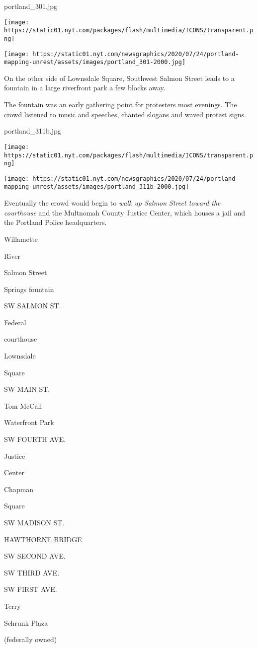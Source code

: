 portland\_301.jpg

\texttt{[image: https://static01.nyt.com/packages/flash/multimedia/ICONS/transparent.png]}

\texttt{[image: https://static01.nyt.com/newsgraphics/2020/07/24/portland-mapping-unrest/assets/images/portland\_301-2000.jpg]}

On the other side of Lownsdale Square, Southwest Salmon Street leads to
a fountain in a large riverfront park a few blocks away.

The fountain was an early gathering point for protesters most evenings.
The crowd listened to music and speeches, chanted slogans and waved
protest signs.

portland\_311b.jpg

\texttt{[image: https://static01.nyt.com/packages/flash/multimedia/ICONS/transparent.png]}

\texttt{[image: https://static01.nyt.com/newsgraphics/2020/07/24/portland-mapping-unrest/assets/images/portland\_311b-2000.jpg]}

Eventually the crowd would begin to \emph{walk up Salmon Street toward
the courthouse} and the Multnomah County Justice Center, which houses a
jail and the Portland Police headquarters.

Willamette

River

Salmon Street

Springs fountain

SW SALMON ST.

Federal

courthouse

Lownsdale

Square

SW MAIN ST.

Tom McCall

Waterfront Park

SW FOURTH AVE.

Justice

Center

Chapman

Square

SW MADISON ST.

HAWTHORNE BRIDGE

SW SECOND AVE.

SW THIRD AVE.

SW FIRST AVE.

Terry

Schrunk Plaza

(federally owned)

